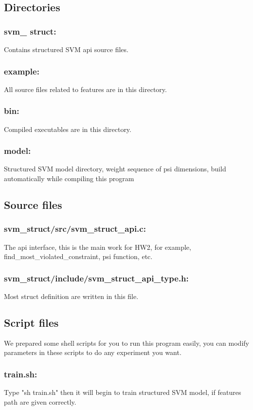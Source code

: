 \documentclass[10pt,a4paper]{article}
\begin{document}
\subsection{Directories}
\subsubsection*{svm\_ struct:}
Contains structured SVM api source files.
\subsubsection*{example:}
All source files related to features are in this directory.
\subsubsection*{bin:}
Compiled executables are in this directory.
\subsubsection*{model:}
Structured SVM model directory, weight sequence of psi dimensions, build automatically while compiling this program

\subsection{Source files}
\subsubsection*{svm\_struct/src/svm\_struct\_api.c:}
The api interface, this is the main work for HW2, for example, find\_most\_violated\_constraint, psi function, etc.
\subsubsection*{svm\_struct/include/svm\_struct\_api\_type.h:}
Most struct definition are written in this file.
\subsection{Script files}
We prepared some shell scripts for you to run this program easily, you can modify parameters in these scripts to do any experiment you want.
\subsubsection*{train.sh:}
Type "sh train.sh" then it will begin to train structured SVM model, if features path are given correctly.
\end{document}
